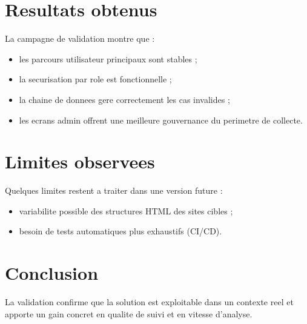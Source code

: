 \section{Resultats obtenus}
La campagne de validation montre que :
\begin{itemize}[leftmargin=1.2cm]
	\item les parcours utilisateur principaux sont stables ;
	\item la securisation par role est fonctionnelle ;
	\item la chaine de donnees gere correctement les cas invalides ;
	\item les ecrans admin offrent une meilleure gouvernance du perimetre de collecte.
\end{itemize}


\section{Limites observees}
Quelques limites restent a traiter dans une version future :
\begin{itemize}[leftmargin=1.2cm]
	\item variabilite possible des structures HTML des sites cibles ;
	\item besoin de tests automatiques plus exhaustifs (CI/CD).
\end{itemize}

\section{Conclusion}
La validation confirme que la solution est exploitable dans un contexte reel et apporte un gain concret en qualite de suivi et en vitesse d'analyse.

\clearpage
